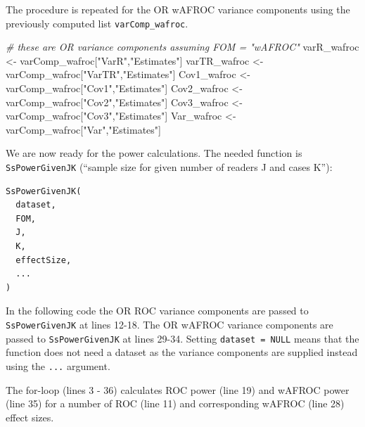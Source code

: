\documentclass[
]{book}
\newenvironment{Shaded}{\begin{snugshade}}{\end{snugshade}}
\newcommand{\CommentTok}[1]{\textcolor[rgb]{0.56,0.35,0.01}{\textit{#1}}}
\newcommand{\NormalTok}[1]{#1}
\newcommand{\OtherTok}[1]{\textcolor[rgb]{0.56,0.35,0.01}{#1}}
\newcommand{\StringTok}[1]{\textcolor[rgb]{0.31,0.60,0.02}{#1}}
\begin{document}
The procedure is repeated for the OR wAFROC variance components using the previously computed list \texttt{varComp\_wafroc}.

\begin{Shaded}
\begin{Highlighting}[numbers=left,,]
\CommentTok{\# these are OR variance components assuming FOM = "wAFROC"}
\NormalTok{varR\_wafroc }\OtherTok{\textless{}{-}}\NormalTok{ varComp\_wafroc[}\StringTok{"VarR"}\NormalTok{,}\StringTok{"Estimates"}\NormalTok{]}
\NormalTok{varTR\_wafroc }\OtherTok{\textless{}{-}}\NormalTok{ varComp\_wafroc[}\StringTok{"VarTR"}\NormalTok{,}\StringTok{"Estimates"}\NormalTok{]}
\NormalTok{Cov1\_wafroc }\OtherTok{\textless{}{-}}\NormalTok{ varComp\_wafroc[}\StringTok{"Cov1"}\NormalTok{,}\StringTok{"Estimates"}\NormalTok{]}
\NormalTok{Cov2\_wafroc }\OtherTok{\textless{}{-}}\NormalTok{ varComp\_wafroc[}\StringTok{"Cov2"}\NormalTok{,}\StringTok{"Estimates"}\NormalTok{]}
\NormalTok{Cov3\_wafroc }\OtherTok{\textless{}{-}}\NormalTok{ varComp\_wafroc[}\StringTok{"Cov3"}\NormalTok{,}\StringTok{"Estimates"}\NormalTok{]}
\NormalTok{Var\_wafroc }\OtherTok{\textless{}{-}}\NormalTok{ varComp\_wafroc[}\StringTok{"Var"}\NormalTok{,}\StringTok{"Estimates"}\NormalTok{]}
\end{Highlighting}
\end{Shaded}

We are now ready for the power calculations. The needed function is \texttt{SsPowerGivenJK} (``sample size for given number of readers J and cases K''):

\begin{verbatim}
SsPowerGivenJK(
  dataset,
  FOM,
  J,
  K,
  effectSize,
  ...
)
\end{verbatim}

In the following code the OR ROC variance components are passed to \texttt{SsPowerGivenJK} at lines 12-18. The OR wAFROC variance components are passed to \texttt{SsPowerGivenJK} at lines 29-34. Setting \texttt{dataset\ =\ NULL} means that the function does not need a dataset as the variance components are supplied instead using the \texttt{...} argument.

The for-loop (lines 3 - 36) calculates ROC power (line 19) and wAFROC power (line 35) for a number of ROC (line 11) and corresponding wAFROC (line 28) effect sizes.
\end{document}
